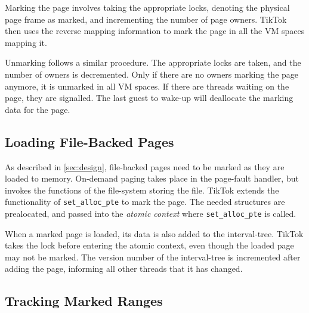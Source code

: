 \documentclass[conference]{IEEEtran}
\newcommand{\sysname}{TikTok}
\begin{document}
Marking the page involves taking the appropriate locks, denoting the physical
page frame as marked, and incrementing the number of page owners. \sysname{} then
uses the reverse mapping information to mark the page in all the VM spaces
mapping it.

Unmarking follows a similar procedure. The appropriate locks are taken, and the
number of owners is decremented. Only if there are no owners marking the page
anymore, it is unmarked in all VM spaces. If there are threads waiting on the
page, they are signalled. The last guest to wake-up will deallocate the marking
data for the page.

\subsection{Loading File-Backed Pages}

As described in \autoref{sec:design}, file-backed pages need to be marked as
they are loaded to memory. On-demand paging takes place in the page-fault
handler, but invokes the functions of the file-system storing the file. \sysname{}
extends the functionality of \texttt{set\_alloc\_pte} to mark the page. The
needed structures are prealocated, and passed into the \emph{atomic context} where 
\texttt{set\_alloc\_pte} is called.

When a marked page is loaded, its data is also added to the interval-tree.
\sysname{} takes the lock before entering the atomic context, even though the
loaded page may not be marked. The version number of the interval-tree is
incremented after adding the page, informing all other threads that it has
changed.

\subsection{Tracking Marked Ranges}
\end{document}
